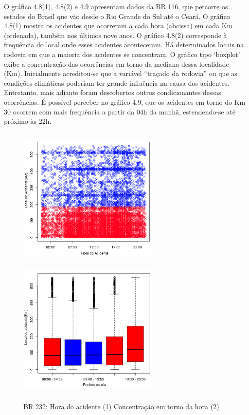 O gráfico 4.8(1), 4.8(2)  e 4.9 apresentam dados da BR 116, que percorre os estados do Brasil que vão desde o Rio Grande do Sul até o Ceará. O gráfico 4.8(1) mostra os acidentes que ocorreram a cada hora (abcissa) em cada Km (ordenada), também nos últimos nove anos. 
O  gráfico 4.8(2) corresponde à frequência do local onde esses acidentes aconteceram. Há determinados locais na rodovia em que a maioria dos acidentes se concentram. 
O gráfico tipo ‘boxplot’ exibe a concentração das ocorrências em torno da mediana dessa localidade (Km). 
Inicialmente acreditou-se que a variável “traçado da rodovia” ou que as condições climáticas poderiam ter grande influência na causa dos acidentes. Entretanto, mais adiante foram descobertos outros condicionantes dessas ocorrências. 
É possível perceber no gráfico 4.9, que os acidentes em torno do Km 30 ocorrem com mais frequência a partir da 04h da manhã, estendendo-se até próximo às 22h. 

\pagebreak

\begin{figure}[h]
	\caption{BR 232: Hora do acidente (1)  Concentração em torno da hora (2)}
	\includegraphics[width=7cm,height=7cm]{Figuras/Preprocess/br232_1.png}
	\includegraphics[width=7cm,height=7cm]{Figuras/Preprocess/br232_32.png}

\end{figure}

